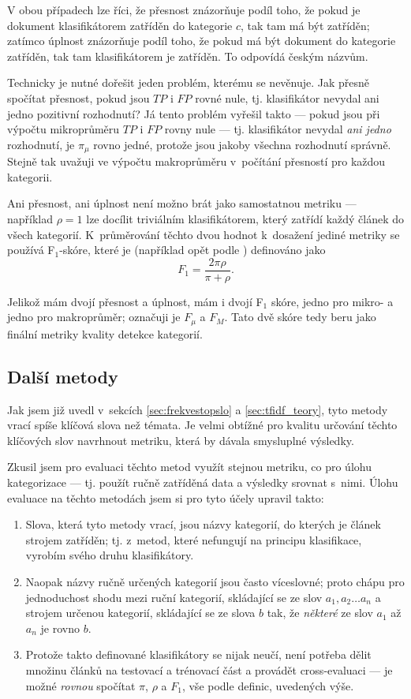\documentclass[12pt,a4paper]{report}
\begin{document}
V obou případech lze říci, že přesnost znázorňuje podíl toho, že pokud je dokument klasifikátorem zatříděn do kategorie $c$, tak tam má být zatříděn; zatímco úplnost znázorňuje podíl toho, že pokud má být dokument do kategorie zatříděn, tak tam klasifikátorem je zatříděn. To odpovídá českým názvům. 

Technicky je nutné dořešit jeden problém, kterému se \cite{machine_intro} ne\-vě\-nu\-je. Jak přesně spočítat přesnost, pokud jsou $TP$ i $FP$ rovné nule, tj. klasifikátor nevydal ani jedno pozitivní rozhodnutí? Já tento problém vyřešil takto --- pokud jsou při výpočtu mikroprůměru $TP$ i $FP$ rovny nule --- tj. klasifikátor nevydal \emph{ani jedno} rozhodnutí, je $\pi_{\mu}$ rovno jedné, protože jsou jakoby všechna rozhodnutí správně. Stejně tak uvažuji ve výpočtu makroprůměru v~počítání  přesností pro každou kategorii.

Ani přesnost, ani úplnost není možno brát jako samostatnou metriku --- například $\rho=1$ lze docílit triviálním klasifikátorem, který zatřídí každý článek do všech kategorií. K~průměrování těchto dvou hodnot k~dosažení jediné metriky se používá F$_1$-skóre, které je (například opět podle \cite{machine_intro}) definováno jako $$F_1=\frac{2\pi\rho}{\pi+\rho}.$$ 

Jelikož mám dvojí přesnost a úplnost, mám i dvojí F$_1$ skóre, jedno pro mikro- a jedno pro makroprůměr; označuji je $F_\mu$ a $F_M$. Tato dvě skóre tedy beru jako finální metriky kvality detekce kategorií.

\subsection{Další metody}
\label{sec:dalsimetody}

Jak jsem již uvedl v~sekcích \ref{sec:frekvestopslo} a \ref{sec:tfidf_teory}, tyto metody vrací spíše klíčová slova než témata. Je velmi obtížné pro kvalitu určování těchto klíčových slov navrhnout metriku, která by dávala smysluplné výsledky.

Zkusil jsem pro evaluaci těchto metod využít stejnou metriku, co pro úlohu kategorizace --- tj. použít ručně zatříděná data a výsledky srovnat s~nimi. Úlohu evaluace na těchto metodách jsem si pro tyto účely upravil takto:
\begin{enumerate}
    \item Slova, která tyto metody vrací, jsou názvy kategorií, do kterých je článek strojem zatříděn; tj. z~metod, které nefungují na principu klasifikace, vyrobím svého druhu klasifikátory.
    \item Naopak názvy ručně určených kategorií jsou často víceslovné; proto chápu pro jednoduchost shodu mezi ruční kategorií, skládající se ze slov $a_1, a_2 \ldots a_n$ a strojem určenou kategorií, skládající se ze slova $b$ tak, že \emph{některé} ze slov $a_1$ až $a_n$ je rovno $b$.
    \item Protože takto definované klasifikátory se nijak neučí, není potřeba dělit množinu článků na testovací a trénovací část a provádět cross-evaluaci --- je možné \emph{rovnou} spočítat $\pi$, $\rho$ a $F_1$, vše podle definic, uvedených výše.
\end{enumerate}
\end{document}

